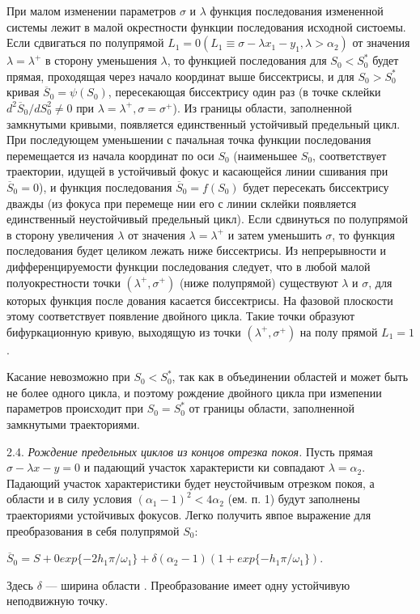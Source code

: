 \documentclass{article}
\newcommand{\RomanNumeralCaps}[1]
    {\MakeUppercase{\romannumeral #1}}
\begin{document}
При малом изменении параметров $\sigma$ и $\lambda$ функция последования
измененной системы лежит в малой окрестности функции
последования исходной систоемы. Если сдвигаться по полупрямой
$L_{1}=0 (L_{1} \equiv \sigma - \lambda x_{1} - y_{1}, \lambda>\alpha_{2})$ от значения $\lambda = \lambda^+$ в сторону уменьшения $\lambda$, то функцией последования для $S_{0}<S_{0}^*$ будет прямая,
проходящая через начало координат выше биссектрисы,
и для $S_{0}>S_{0}^*$ кривая $\overline{S}_{0}=\psi(S_{0})$, пересекающая биссектрису
один раз (в точке склейки $d^2\overline{S}_{0}/dS_{0}^2 \neq 0$ при $\lambda = \lambda^+, \sigma=\sigma^+$). Из
границы области, заполненной замкнутыми кривыми, появляется
единственный устойчивый предельный цикл. При последующем
уменьшении с пачальная точка функции последования перемещается 
из начала координат по оси $S_{0}$ (наименьшее $S_{0}$, соответствует 
траектории, идущей в устойчивый фокус и касающейся
линии сшивания при $\overline{S}_{0}= 0$), и функция последования $\overline{S}_{0}=f(S_{0})$
будет пересекать биссектрису дважды (из фокуса при перемеще
нии его с линии склейки появляется единственный неустойчивый
предельный цикл). Если сдвинуться по полупрямой в сторону
увеличения $\lambda$ от значения $\lambda = \lambda^+$ и затем уменьшить $\sigma$, то функция 
последования будет целиком лежать ниже биссектрисы. Из
непрерывности и дифференцируемости функции последования
следует, что в любой малой полуокрестности точки $(\lambda^+, \sigma^+)$ (ниже 
полупрямой) существуют $\lambda$ и $\sigma$, для которых функция после
дования касается биссектрисы. На фазовой плоскости этому соответствует 
появление двойного цикла. Такие точки образуют бифуркационную 
кривую, выходящую из точки $(\lambda^+, \sigma^+)$ на полу
прямой $L_{1}=1$.

Касание невозможно при $S_{0}<S_{0}^*$, так как в объединении областей 
\RomanNumeralCaps{1} и \RomanNumeralCaps{2} может быть не более одного цикла, и поэтому рождение 
двойного цикла при измепении параметров происходит при
$S_{0}=S_{0}^*$ от границы области, заполненной замкнутыми траекториями.

2.4. \textit{Рождение предельных циклов из концов отрезка покоя.}
Пусть прямая $\sigma - \lambda x - y = 0$ и падающий участок характеристи
ки совпадают $\lambda = \alpha_{2}$. Падающий участок характеристики будет
неустойчивым отрезком покоя, а области \RomanNumeralCaps{1} и \RomanNumeralCaps{2} в силу условия
$(\alpha_{1} - 1)^2<4 \alpha_{2}$ (ем. п. 1) будут заполнены траекториями устойчивых 
фокусов. Легко получить явпое выражение для преобразования 
в себя полупрямой $S_{0}$:
\begin{center}
$\overline{S}_{0}=S+{0} exp \{-2h_{1} \pi / \omega_{1}\} + \delta (\alpha_{2} - 1) (1 + exp \{-h_{1} \pi / \omega_{1}\}).$
\end{center}
Здесь $\delta$ — ширина области \RomanNumeralCaps{2}. Преобразование имеет одну устойчивую 
неподвижную точку.
\end{document}
